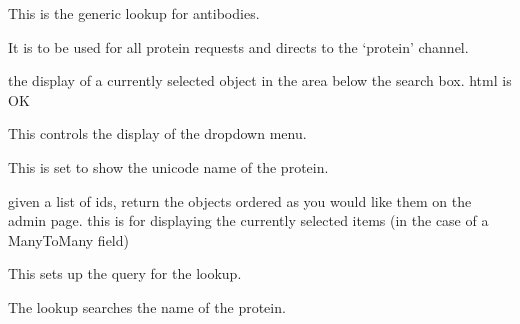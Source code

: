 \documentclass[letterpaper,10pt,english]{sphinxmanual}
\begin{document}
\begin{fulllineitems}
\label{api:experimentdb.proteins.lookups.ProteinLookup}
This is the generic lookup for antibodies.

It is to be used for all protein requests and directs to the `protein' channel.

\begin{fulllineitems}
\label{api:experimentdb.proteins.lookups.ProteinLookup.format_item}
the display of a currently selected object in the area below the search box. html is OK

\end{fulllineitems}


\begin{fulllineitems}
\label{api:experimentdb.proteins.lookups.ProteinLookup.format_result}
This controls the display of the dropdown menu.

This is set to show the unicode name of the protein.

\end{fulllineitems}


\begin{fulllineitems}
\label{api:experimentdb.proteins.lookups.ProteinLookup.get_objects}
given a list of ids, return the objects ordered as you would like them on the admin page.
this is for displaying the currently selected items (in the case of a ManyToMany field)

\end{fulllineitems}


\begin{fulllineitems}
\label{api:experimentdb.proteins.lookups.ProteinLookup.get_query}
This sets up the query for the lookup.

The lookup searches the name of the protein.

\end{fulllineitems}


\end{fulllineitems}
\end{document}
